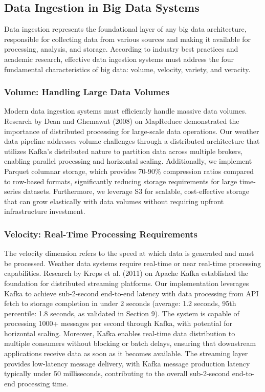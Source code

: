 \documentclass[12pt,a4paper]{article}
\begin{document}
\subsection{Data Ingestion in Big Data Systems}

Data ingestion represents the foundational layer of any big data architecture, responsible for collecting data from various sources and making it available for processing, analysis, and storage. According to industry best practices and academic research, effective data ingestion systems must address the four fundamental characteristics of big data: volume, velocity, variety, and veracity.

\subsubsection{Volume: Handling Large Data Volumes}

Modern data ingestion systems must efficiently handle massive data volumes. Research by Dean and Ghemawat (2008) on MapReduce demonstrated the importance of distributed processing for large-scale data operations. Our weather data pipeline addresses volume challenges through a distributed architecture that utilizes Kafka's distributed nature to partition data across multiple brokers, enabling parallel processing and horizontal scaling. Additionally, we implement Parquet columnar storage, which provides 70-90\% compression ratios compared to row-based formats, significantly reducing storage requirements for large time-series datasets. Furthermore, we leverage S3 for scalable, cost-effective storage that can grow elastically with data volumes without requiring upfront infrastructure investment.

\subsubsection{Velocity: Real-Time Processing Requirements}

The velocity dimension refers to the speed at which data is generated and must be processed. Weather data systems require real-time or near real-time processing capabilities. Research by Kreps et al. (2011) on Apache Kafka established the foundation for distributed streaming platforms. Our implementation leverages Kafka to achieve sub-2-second end-to-end latency with data processing from API fetch to storage completion in under 2 seconds (average: 1.2 seconds, 95th percentile: 1.8 seconds, as validated in Section 9). The system is capable of processing 1000+ messages per second through Kafka, with potential for horizontal scaling. Moreover, Kafka enables real-time data distribution to multiple consumers without blocking or batch delays, ensuring that downstream applications receive data as soon as it becomes available. The streaming layer provides low-latency message delivery, with Kafka message production latency typically under 50 milliseconds, contributing to the overall sub-2-second end-to-end processing time.
\end{document}
